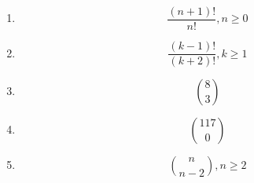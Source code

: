 \begin{enumerate}
\begin{enumerate}
\item 
\begin{equation*}
\frac{(n+1)!}{n!}, n\ge 0
\end{equation*}

\item 
\begin{equation*}
\frac{(k-1)!}{(k+2)!}, k\ge 1
\end{equation*}

\item 
\begin{equation*}
\binom{8}{3}
\end{equation*}

\item 
\begin{equation*}
\binom{117}{0}
\end{equation*}

\item 
\begin{equation*}
\binom{n}{n-2}, n \ge 2
\end{equation*}

\end{enumerate}






\end{enumerate}
